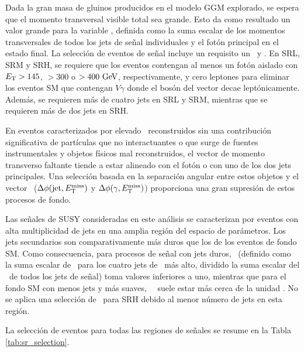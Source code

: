 Dada la gran masa de gluinos producidos en el modelo GGM explorado, se espera que el momento transversal visible total sea grande. Esto da como resultado un valor grande para la variable \HT, definida como la suma escalar de los momentos transversales de todos los jets de señal individuales y el fotón principal en el estado final.
La selección de eventos de señal incluye un requisito un \HT \ y \met.
En SRL, SRM y SRH, se requiere que los eventos contengan al menos un fotón aislado con $E_{\text{T}}> 145$, $>300 $ o $>400\ \text{GeV}$, respectivamente, y cero leptones para eliminar los eventos SM que contengan $ V\gamma$ donde el bosón del vector decae leptónicamente. Además, se requieren más de cuatro jets en SRL y SRM, mientras que se requieren más de dos jets en SRH.

En eventos caracterizados por elevado \met\ reconstruidos sin una contribución significativa de partículas que no interactuantes o que surge de fuentes instrumentales y objetos físicos mal reconstruidos, el vector de momento transverso faltante tiende a
estar alineado con el fotón o con uno de los dos jets principales. Una selección basada en la separación angular entre estos objetos y el vector \met\ ($\Delta\phi(\text{jet}, E_{\text{T}}^{\text{miss}})$ y $\Delta\phi(\gamma, E_{\text{T}}^{\text{miss}})$) proporciona una gran supresión de estos procesos de fondo.

Las señales de SUSY consideradas en este análisis se caracterizan por
eventos con alta multiplicidad de jets en una amplia región del espacio de parámetros. Los jets secundarios son comparativamente más duros que los de los eventos de fondo SM. Como consecuencia, para procesos de señal con jets duros, \rtf\ (definido como la suma escalar de \pt\ para los cuatro jets de \pt\ más alto, dividido la suma escalar del \pt\ de todos los jets de señal) toma valores inferiores a uno, mientras que para el fondo SM con menos jets y más suaves, \ \rtf\ suele estar más cerca de la unidad \cite{SUSY-2016-27}.
No se aplica una selección de \rtf\ para SRH debido al menor número de jets en esta región.

La selección de eventos para todas las regiones de señales se resume en la Tabla \ref{tab:sr_selection}. 

